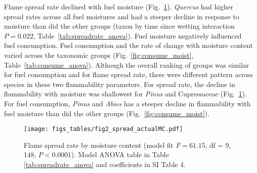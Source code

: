 \documentclass[letterpaper,12pt]{article}
\begin{document}
Flame spread rate declined with fuel moisture (Fig.~\ref{fig:spread_moist}).
\emph{Quercus} had higher spread rates across all fuel moistures and had a
steeper decline in response to moisture than did the other groups (taxon by
time since wetting interaction $P = 0.022$, Table~\ref{tab:spreadrate_anova}).
Fuel moisture negatively influenced fuel consumption. Fuel consumption and the
rate of change with moisture content varied across the taxonomic groups
(Fig.~\ref{fig:consume_moist}, Table~\ref{tab:consume_anova}). Although the
overall ranking of groups was similar for fuel consumption and for flame spread
rate, there were different pattern across species in these two flammability
parameters. For spread rate, the decline in flammability with moisture was
shallowest for \emph{Pinus} and Cupressaceae (Fig.~\ref{fig:spread_moist}). For
fuel consumption, \emph{Pinus} and \emph{Abies} has a steeper decline in
flammability with fuel moisture than did the other groups
(Fig.~\ref{fig:consume_moist}).

\begin{figure}[h]
  \centering
\texttt{[image: figs\_tables/fig2\_spread\_actualMC.pdf]}
\caption{Flame spread rate by moisture content (model fit $F = 61.15$, df = 9,
  148, $P < 0.0001$). Model ANOVA table in Table \ref{tab:spreadrate_anova} and
  coefficients in SI Table 4.}
  \label{fig:spread_moist}
\end{figure}
\end{document}
